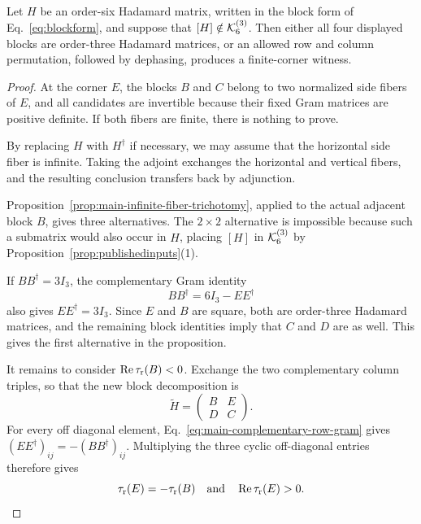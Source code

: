 \begin{proposition}
\label{prop:main-corner-routing}
Let $H$ be an order-six Hadamard matrix, written in the block form
of Eq.~\eqref{eq:blockform}, and suppose that
$[H]\notin\mathcal K_6^{(3)}$. Then either all four displayed blocks are
order-three Hadamard matrices, or an allowed row and column permutation,
followed by dephasing, produces a finite-corner witness.
\end{proposition}

\begin{proof}
At the corner $E$, the blocks $B$ and $C$ belong to two normalized side fibers of $E$, and all candidates are invertible because their fixed Gram matrices are positive definite. If both fibers are finite, there is nothing to prove.

By replacing $H$ with $H^\dagger$ if necessary, we may assume that the horizontal side fiber is infinite.  Taking the adjoint exchanges the horizontal and vertical fibers, and the resulting conclusion transfers back by adjunction.

Proposition~\ref{prop:main-infinite-fiber-trichotomy}, applied to the actual adjacent block $B$, gives three alternatives. The $2\times2$ alternative is impossible because such a submatrix would also occur in $H$, placing $[H]$ in $\mathcal K_6^{(3)}$ by Proposition~\ref{prop:publishedinputs}(1).

If $BB^\dagger=3I_3$, the complementary Gram identity
\begin{equation}
BB^\dagger=6I_3-EE^\dagger
\label{eq:main-complementary-row-gram}
\end{equation}
also gives $EE^\dagger=3I_3$. Since $E$ and $B$ are square, both are order-three Hadamard matrices, and the remaining block identities imply that $C$ and $D$ are as well. This gives the first alternative in the proposition.

It remains to consider $\operatorname{Re}\tau_{\rm r}(B)<0$.
Exchange the two complementary column triples, so that the new block decomposition is
\begin{equation}
    \widetilde H=
    \begin{pmatrix}
    B&E\\
    D&C
    \end{pmatrix}.
\end{equation}
For every off diagonal element, Eq.~\eqref{eq:main-complementary-row-gram} gives $(EE^\dagger)_{ij}=-(BB^\dagger)_{ij}$.
Multiplying the three cyclic off-diagonal entries therefore gives
\begin{equation}
\tau_{\rm r}(E)=-\tau_{\rm r}(B)
\quad \text{and} \quad
\operatorname{Re}\tau_{\rm r}(E)>0.
\label{eq:main-complementary-cubic-sign}
\end{equation}



\end{proof}
